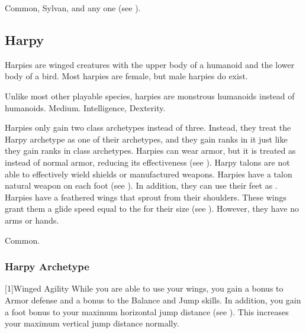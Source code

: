          Common, Sylvan, and any one  (see ).

    \subsection{Harpy}
        Harpies are winged creatures with the upper body of a humanoid and the lower body of a bird.
        Most harpies are female, but male harpies do exist.

         Unlike most other playable species, harpies are monstrous humanoids instead of humanoids.
         Medium.
          Intelligence,  Dexterity.
        \begin{itemize}
             Harpies only gain two class archetypes instead of three.
                Instead, they treat the Harpy archetype as one of their archetypes, and they gain ranks in it just like they gain ranks in class archetypes.
             Harpies can wear armor, but it is treated as  instead of normal armor, reducing its effectiveness (see ).
                Harpy talons are not able to effectively wield shields or manufactured weapons.
             Harpies have a talon natural weapon on each foot (see ).
                In addition, they can use their feet as .
             Harpies have a feathered wings that sprout from their shoulders.
                These wings grant them a glide speed equal to the  for their size (see ).
                However, they have no arms or hands.
        \end{itemize}
         Common.
        
        \subsubsection{Harpy Archetype}

            [1]{Winged Agility} While you are able to use your wings, you gain a  bonus to Armor defense and a  bonus to the Balance and Jump skills.
            In addition, you gain a  foot bonus to your maximum horizontal jump distance (see ).
            This increases your maximum vertical jump distance normally.

